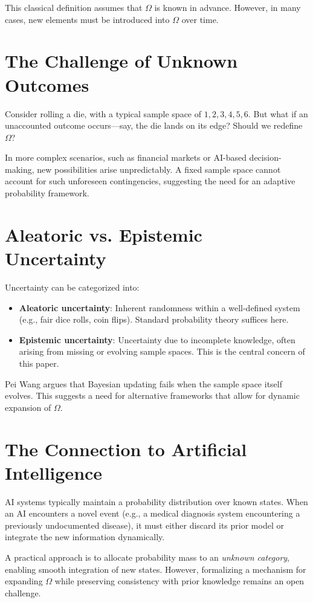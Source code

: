 \documentclass{article}
\begin{document}
This classical definition assumes that $\Omega$ is known in advance. However, in many cases, new elements must be introduced into $\Omega$ over time.

\section{The Challenge of Unknown Outcomes}
Consider rolling a die, with a typical sample space of ${1, 2, 3, 4, 5, 6}$. But what if an unaccounted outcome occurs—say, the die lands on its edge? Should we redefine $\Omega$?

In more complex scenarios, such as financial markets or AI-based decision-making, new possibilities arise unpredictably. A fixed sample space cannot account for such unforeseen contingencies, suggesting the need for an adaptive probability framework.

\section{Aleatoric vs. Epistemic Uncertainty}
Uncertainty can be categorized into:

\begin{itemize}
\item \textbf{Aleatoric uncertainty}: Inherent randomness within a well-defined system (e.g., fair dice rolls, coin flips). Standard probability theory suffices here.
\item \textbf{Epistemic uncertainty}: Uncertainty due to incomplete knowledge, often arising from missing or evolving sample spaces. This is the central concern of this paper.
\end{itemize}

Pei Wang \cite{wang2004bayesianism} argues that Bayesian updating fails when the sample space itself evolves. This suggests a need for alternative frameworks that allow for dynamic expansion of $\Omega$.

\section{The Connection to Artificial Intelligence}
AI systems typically maintain a probability distribution over known states. When an AI encounters a novel event (e.g., a medical diagnosis system encountering a previously undocumented disease), it must either discard its prior model or integrate the new information dynamically.

A practical approach is to allocate probability mass to an \textit{unknown category}, enabling smooth integration of new states. However, formalizing a mechanism for expanding $\Omega$ while preserving consistency with prior knowledge remains an open challenge.
\end{document}
